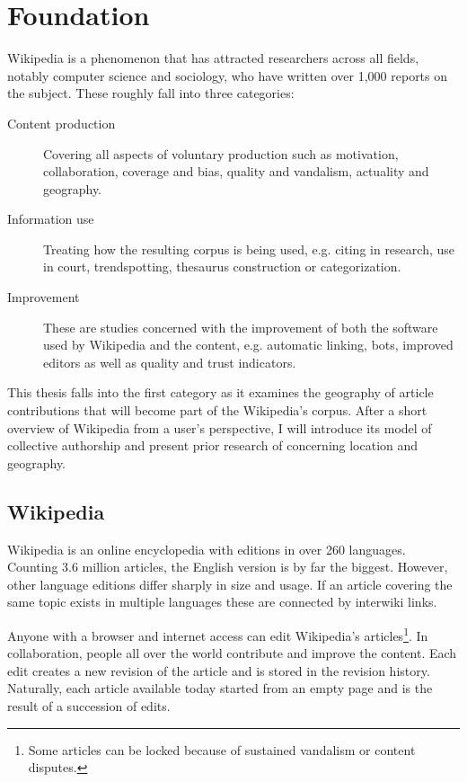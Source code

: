 \chapter{Foundation}\label{ch:foundation}

Wikipedia is a phenomenon that has attracted researchers across all fields, notably computer science and sociology, who have written over 1,000 reports on the subject.\cite{nielsen2011wikipedia}
These roughly fall into three categories: 
\begin{description}
\item[Content production] Covering all aspects of voluntary production such as motivation, collaboration, coverage and bias, quality and vandalism, actuality and geography.
\item[Information use] Treating how the resulting corpus is being used, e.g. citing in research, use in court, trendspotting, thesaurus construction or categorization.
\item[Improvement] These are studies concerned with the improvement of both the software used by Wikipedia and the content, e.g. automatic linking, bots, improved editors as well as quality and trust indicators. 
\end{description}

This thesis falls into the first category as it examines the geography of article contributions that will become part of the Wikipedia's corpus.
After a short overview of Wikipedia from a user's perspective, I will introduce its model of collective authorship and present prior research of concerning location and geography. 

\section{Wikipedia}\label{sec:wikipedia}

Wikipedia is an online encyclopedia with editions in over 260 languages.
Counting 3.6 million articles, the English version is by far the biggest.
However, other language editions differ sharply in size and usage.\cite{wikistats}
If an article covering the same topic exists in multiple languages these are connected by interwiki links.


Anyone with a browser and internet access can edit Wikipedia's articles\footnote{Some articles can be locked because of sustained vandalism or content disputes.\cite{wpprotectionpolicy}}.
In collaboration, people all over the world contribute and improve the content. 
Each edit creates a new revision of the article and is stored in the revision history.
Naturally, each article available today started from an empty page and is the result of a succession of edits.

